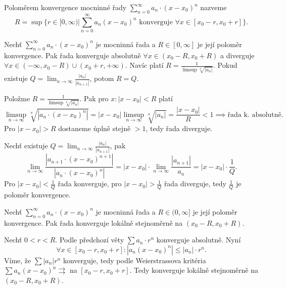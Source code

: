 \documentclass[12pt]{article}					%
\begin{document}
	\begin{definice}
		Poloměrem konvergence mocninné řady $\sum_{n=0}^∞ a_n·(x - x_0)^n$ nazveme
		$$ R = \sup\{r \in [0, ∞) | \sum_{n=0}^∞ a_n (x - x_0)^n \text{ konverguje } \forall x \in [x_0 - r, x_0 + r]\}. $$
	\end{definice}

	\begin{veta}
		Nechť $\sum_{n=0}^∞ a_n·(x - x_0)^n$ je mocninná řada a $R \in [0, ∞]$ je její poloměr konvergence. Pak řada konverguje absolutně $\forall x \in (x_0 - R, x_0 + R)$ a diverguje $\forall x \in (-∞, x_0 - R) \cup (x_0 + r, +∞)$. Navíc platí $R = \frac{1}{\limsup \sqrt[n]{|a_n|}}$. Pokud existuje $Q = \lim_{n \rightarrow ∞} \frac{|a_n|}{|a_{n+1}|}$, potom $R = Q$.

		\begin{dukazin}
			Položme $R = \frac{1}{\limsup \sqrt[n]{|a_n|}}$. Pak pro $x: |x - x_0| < R$ platí
			$$ \limsup_{n \rightarrow ∞} \sqrt[n]{|a_n·(x - x_0)^n|} = |x - x_0| \limsup_{n \rightarrow ∞} \sqrt[n]{|a_n|} = \frac{|x - x_0|}{R} < 1 \implies \text{řada k. absolutně.} $$
			Pro $|x - x_0| > R$ dostaneme úplně stejně $> 1$, tedy řada diverguje.

			Nechť existuje $Q = \lim_{n \rightarrow ∞} \frac{|a_n|}{|a_{n+1}|}$, pak
			$$ \lim_{n \rightarrow ∞} \frac{|a_{n+1}·(x - x_0)^{n+1}|}{|a_n·(x - x_0)^n|} = |x - x_0|·\lim_{n \rightarrow ∞} \frac{|a_{n+1}|}{a_n} = |x - x_0|·\frac{1}{Q}. $$
			Pro $|x - x_0| < \frac{1}{Q}$ řada konverguje, pro $|x - x_0| > \frac{1}{Q}$ řada diverguje, tedy $\frac{1}{Q}$ je poloměr konvergence.
		\end{dukazin}
	\end{veta}

	\begin{veta}
		Nechť $\sum_{n=0}^∞ a_n·(x - x_0)^n$ je mocninná řada a $R \in (0, ∞]$ je její poloměr konvergence. Pak řada konverguje lokálně stejnoměrně na $(x_0 - R, x_0 + R)$.

		\begin{dukazin}
			Nechť $0 < r < R$. Podle předchozí věty $\sum a_n·r^n$ konverguje absolutně. Nyní
			$$ \forall x \in [x_0 - r, x_0 + r]: |a_n(x - x_0)^n| ≤ |a_n|·r^n. $$
			Víme, že $\sum |a_n| r^n$ konverguje, tedy podle Weierstrassova kritéria $\sum a_n(x - x_0)^n \rightrightarrows$ na $[x_0 - r, x_0 + r]$. Tedy konverguje lokálně stejnoměrně na $(x_0 - R, x_0 + R)$.
		\end{dukazin}
	\end{veta}
\end{document}
